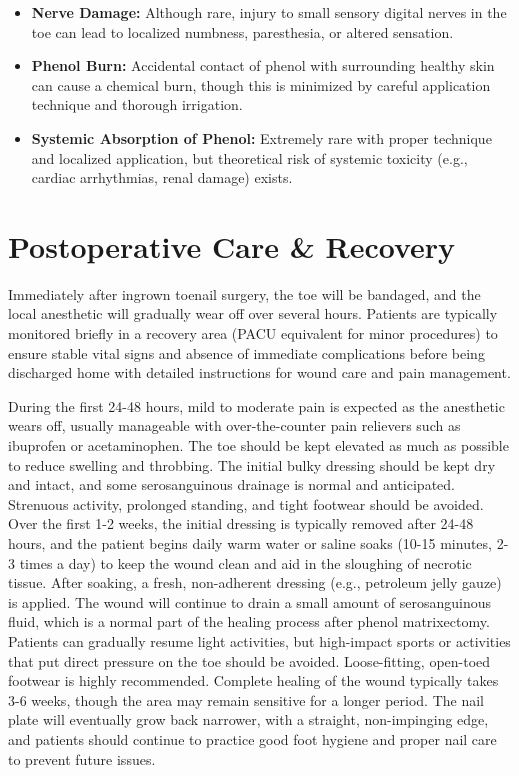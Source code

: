 \begin{itemize}
\begin{itemize}
      \item  \textbf{Nerve Damage:} Although rare, injury to small sensory digital nerves in the toe can lead to localized numbness, paresthesia, or altered sensation.
      \item  \textbf{Phenol Burn:} Accidental contact of phenol with surrounding healthy skin can cause a chemical burn, though this is minimized by careful application technique and thorough irrigation.
      \item  \textbf{Systemic Absorption of Phenol:} Extremely rare with proper technique and localized application, but theoretical risk of systemic toxicity (e.g., cardiac arrhythmias, renal damage) exists.
    \end{itemize}
\end{itemize}

\section*{Postoperative Care \& Recovery}
Immediately after ingrown toenail surgery, the toe will be bandaged, and the local anesthetic will gradually wear off over several hours. Patients are typically monitored briefly in a recovery area (PACU equivalent for minor procedures) to ensure stable vital signs and absence of immediate complications before being discharged home with detailed instructions for wound care and pain management.

During the first 24-48 hours, mild to moderate pain is expected as the anesthetic wears off, usually manageable with over-the-counter pain relievers such as ibuprofen or acetaminophen. The toe should be kept elevated as much as possible to reduce swelling and throbbing. The initial bulky dressing should be kept dry and intact, and some serosanguinous drainage is normal and anticipated. Strenuous activity, prolonged standing, and tight footwear should be avoided. Over the first 1-2 weeks, the initial dressing is typically removed after 24-48 hours, and the patient begins daily warm water or saline soaks (10-15 minutes, 2-3 times a day) to keep the wound clean and aid in the sloughing of necrotic tissue. After soaking, a fresh, non-adherent dressing (e.g., petroleum jelly gauze) is applied. The wound will continue to drain a small amount of serosanguinous fluid, which is a normal part of the healing process after phenol matrixectomy. Patients can gradually resume light activities, but high-impact sports or activities that put direct pressure on the toe should be avoided. Loose-fitting, open-toed footwear is highly recommended. Complete healing of the wound typically takes 3-6 weeks, though the area may remain sensitive for a longer period. The nail plate will eventually grow back narrower, with a straight, non-impinging edge, and patients should continue to practice good foot hygiene and proper nail care to prevent future issues.

